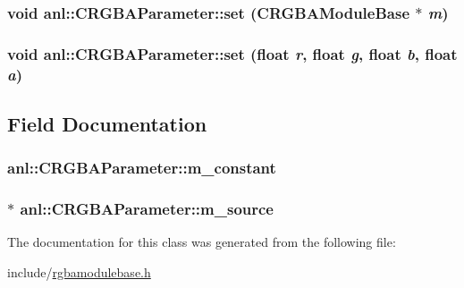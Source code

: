 \label{classanl_1_1CRGBAParameter_a078b10c4c7d73a2a0be56335d6ee6f98}
\hypertarget{classanl_1_1CRGBAParameter_aff279a94ad0da6922362e41ed621995a}{
\subsubsection[{set}]{\setlength{\rightskip}{0pt plus 5cm}void anl::CRGBAParameter::set ({\bf CRGBAModuleBase} $\ast$ {\em m})}}
\label{classanl_1_1CRGBAParameter_aff279a94ad0da6922362e41ed621995a}
\hypertarget{classanl_1_1CRGBAParameter_a95e40e0fc16dc9e05dfce27f99957695}{
\subsubsection[{set}]{\setlength{\rightskip}{0pt plus 5cm}void anl::CRGBAParameter::set (float {\em r}, \/  float {\em g}, \/  float {\em b}, \/  float {\em a})}}
\label{classanl_1_1CRGBAParameter_a95e40e0fc16dc9e05dfce27f99957695}


\subsection{Field Documentation}
\hypertarget{classanl_1_1CRGBAParameter_a55fdb9fe2561c3eba15e7fa283129d9a}{
\subsubsection[{m\_\-constant}]{ {\bf anl::CRGBAParameter::m\_\-constant}}}
\label{classanl_1_1CRGBAParameter_a55fdb9fe2561c3eba15e7fa283129d9a}
\hypertarget{classanl_1_1CRGBAParameter_a4c1972ddf774b961c306c9725d3b9ac8}{
\subsubsection[{m\_\-source}]{$\ast$ {\bf anl::CRGBAParameter::m\_\-source}}}
\label{classanl_1_1CRGBAParameter_a4c1972ddf774b961c306c9725d3b9ac8}


The documentation for this class was generated from the following file:\begin{DoxyCompactItemize}
\item 
include/\hyperlink{rgbamodulebase_8h}{rgbamodulebase.h}\end{DoxyCompactItemize}
